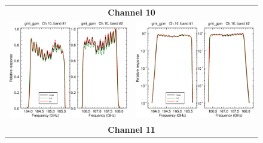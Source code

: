 \begin{figure}[H]
  \centering
  \begin{tabular}{c c}
    \multicolumn{2}{c}{\sffamily\textbf{Channel 10}}\\
    \includegraphics[scale=0.35]{graphics/lin/gmi_gpm-10.eps} &
    \includegraphics[scale=0.35]{graphics/log/gmi_gpm-10.eps} \\
    \multicolumn{2}{c}{\sffamily\textbf{Channel 11}}\\

\end{tabular}
\end{figure}
